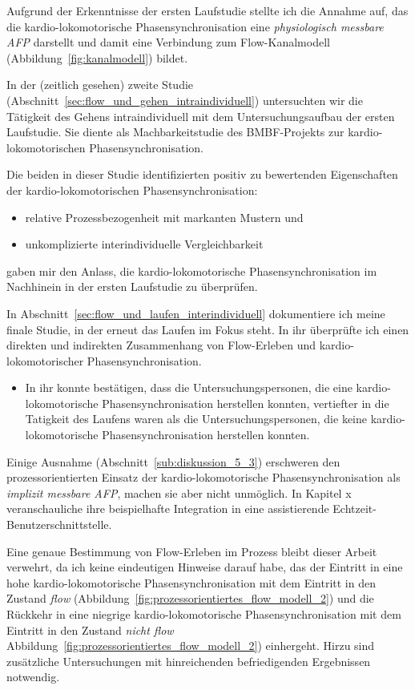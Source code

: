 Aufgrund der Erkenntnisse der ersten Laufstudie stellte ich die Annahme auf, das die kardio-lokomotorische Phasensynchronisation eine \emph{physiologisch messbare \ac{AFP}} darstellt und damit eine Verbindung zum Flow-Kanalmodell (Abbildung~\ref{fig:kanalmodell}) bildet.

In der (zeitlich gesehen) zweite Studie (Abschnitt~\ref{sec:flow_und_gehen_intraindividuell}) untersuchten wir die Tätigkeit des Gehens intraindividuell mit dem Untersuchungsaufbau der ersten Laufstudie. Sie diente als Machbarkeitstudie des \acs{BMBF}-Projekts zur kardio-lokomotorischen Phasensynchronisation. 

Die beiden in dieser Studie identifizierten positiv zu bewertenden Eigenschaften der kardio-lokomotorischen Phasensynchronisation: 
\begin{itemize}
	
	\item relative Prozessbezogenheit mit markanten Mustern und
	
	\item unkomplizierte interindividuelle Vergleichbarkeit 
\end{itemize}

gaben mir den Anlass, die kardio-lokomotorische Phasensynchronisation im Nachhinein in der ersten Laufstudie zu überprüfen. 

In Abschnitt~\ref{sec:flow_und_laufen_interindividuell} dokumentiere ich meine finale Studie, in der erneut das Laufen im Fokus steht. In ihr überprüfte ich einen direkten und indirekten Zusammenhang von Flow-Erleben und kardio-lokomotorischer Phasensynchronisation. 
\begin{itemize}
	
	\item In ihr konnte bestätigen, dass die Untersuchungspersonen, die eine kardio-lokomotorische Phasensynchronisation herstellen konnten, vertiefter in die Tatigkeit des Laufens waren als die Untersuchungspersonen, die keine kardio-lokomotorische Phasensynchronisation herstellen konnten. 
\end{itemize}

Einige Ausnahme (Abschnitt~\ref{sub:diskussion_5_3}) erschweren den prozessorientierten Einsatz der kardio-lokomotorische Phasensynchronisation als \emph{implizit messbare \ac{AFP}}, machen sie aber nicht unmöglich. In Kapitel x veranschauliche ihre beispielhafte Integration in eine assistierende Echtzeit-Benutzerschnittstelle.

Eine genaue Bestimmung von Flow-Erleben im Prozess bleibt dieser Arbeit verwehrt, da ich keine eindeutigen Hinweise darauf habe, das der Eintritt in eine hohe kardio-lokomotorische Phasensynchronisation mit dem Eintritt in den Zustand \emph{flow} (Abbildung~\ref{fig:prozessorientiertes_flow_modell_2}) und die Rückkehr in eine niegrige kardio-lokomotorische Phasensynchronisation mit dem Eintritt in den Zustand \emph{nicht flow} Abbildung~\ref{fig:prozessorientiertes_flow_modell_2}) einhergeht. Hirzu sind zusätzliche Untersuchungen mit hinreichenden befriedigenden Ergebnissen notwendig. 
